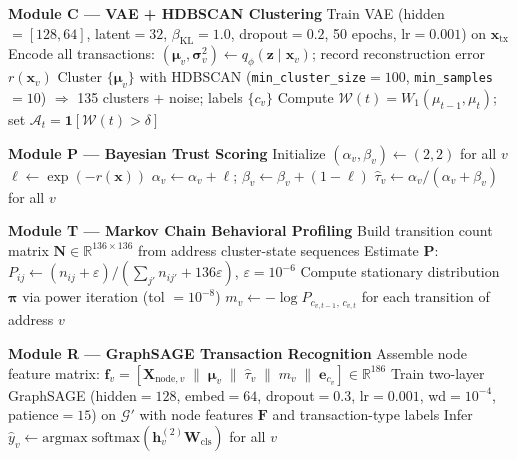 \documentclass[journal]{IEEEtran}
\begin{document}
\begin{algorithm}[t]
\begin{algorithmic}[1]
\Statex
\Statex \textbf{Module C — VAE + HDBSCAN Clustering}
\State Train VAE (hidden$=[128,64]$, latent$=32$, $\beta_{\mathrm{KL}}=1.0$,
       dropout$=0.2$, 50 epochs, lr$=0.001$) on $\mathbf{x}_{\mathrm{tx}}$
\State Encode all transactions:
       $(\boldsymbol{\mu}_v, \boldsymbol{\sigma}^2_v)
        \leftarrow q_\phi(\mathbf{z} \mid \mathbf{x}_v)$;
       record reconstruction error $r(\mathbf{x}_v)$
\State Cluster $\{\boldsymbol{\mu}_v\}$ with HDBSCAN
       (\texttt{min\_cluster\_size}$=100$, \texttt{min\_samples}$=10$)
       $\Rightarrow$ 135 clusters + noise; labels $\{c_v\}$
    \State Compute $\mathcal{W}(t) = W_1(\mu_{t-1}, \mu_t)$;
           set $\mathcal{A}_t = \mathbf{1}[\mathcal{W}(t) > \delta]$
\EndFor

\Statex
\Statex \textbf{Module P — Bayesian Trust Scoring}
\State Initialize $(\alpha_v, \beta_v) \leftarrow (2, 2)$ for all $v$
    \State $\ell \leftarrow \exp(-r(\mathbf{x}))$
    \State $\alpha_v \leftarrow \alpha_v + \ell$;\quad
           $\beta_v \leftarrow \beta_v + (1-\ell)$
\EndFor
\State $\hat{\tau}_v \leftarrow \alpha_v / (\alpha_v + \beta_v)$
       for all $v$

\Statex
\Statex \textbf{Module T — Markov Chain Behavioral Profiling}
\State Build transition count matrix $\mathbf{N} \in \mathbb{R}^{136 \times 136}$
       from address cluster-state sequences
\State Estimate $\mathbf{P}$:
       $P_{ij} \leftarrow (n_{ij} + \varepsilon) /
                           (\sum_{j'} n_{ij'} + 136\varepsilon)$,\;
       $\varepsilon = 10^{-6}$
\State Compute stationary distribution $\boldsymbol{\pi}$ via power iteration
       (tol $=10^{-8}$)
\State $m_v \leftarrow -\log P_{c_{v,t-1},\, c_{v,t}}$
       for each transition of address $v$

\Statex
\Statex \textbf{Module R — GraphSAGE Transaction Recognition}
\State Assemble node feature matrix:
       $\mathbf{f}_v =
        [\mathbf{X}_{\mathrm{node},v} \;\|\;
         \boldsymbol{\mu}_v \;\|\;
         \hat{\tau}_v \;\|\;
         m_v \;\|\;
         \mathbf{e}_{c_v}]
        \in \mathbb{R}^{186}$
\State Train two-layer GraphSAGE (hidden$=128$, embed$=64$, dropout$=0.3$,
       lr$=0.001$, wd$=10^{-4}$, patience$=15$) on $\mathcal{G}'$
       with node features $\mathbf{F}$ and transaction-type labels
\State Infer $\hat{y}_v \leftarrow \mathrm{argmax}\;\mathrm{softmax}
       (\mathbf{h}_v^{(2)}\mathbf{W}_{\mathrm{cls}})$ for all $v$


\end{algorithmic}
\end{algorithm}
\end{document}
